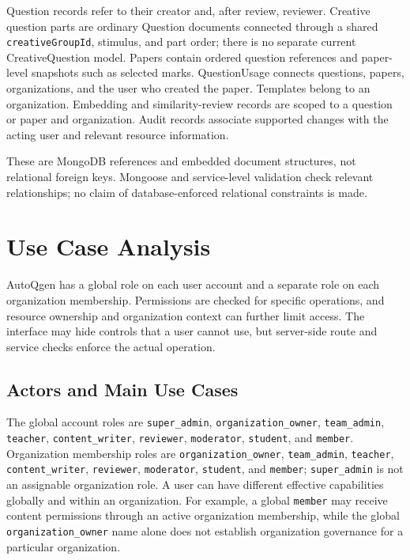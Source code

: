 Question records refer to their creator and, after review, reviewer. Creative question parts are ordinary Question documents connected through a shared \texttt{creativeGroupId}, stimulus, and part order; there is no separate current CreativeQuestion model. Papers contain ordered question references and paper-level snapshots such as selected marks. QuestionUsage connects questions, papers, organizations, and the user who created the paper. Templates belong to an organization. Embedding and similarity-review records are scoped to a question or paper and organization. Audit records associate supported changes with the acting user and relevant resource information.

These are MongoDB references and embedded document structures, not relational foreign keys. Mongoose and service-level validation check relevant relationships; no claim of database-enforced relational constraints is made.



\section{Use Case Analysis}

AutoQgen has a global role on each user account and a separate role on each organization membership. Permissions are checked for specific operations, and resource ownership and organization context can further limit access. The interface may hide controls that a user cannot use, but server-side route and service checks enforce the actual operation.

\subsection{Actors and Main Use Cases}

The global account roles are \texttt{super\_admin}, \texttt{organization\_owner}, \texttt{team\_admin}, \texttt{teacher}, \texttt{content\_writer}, \texttt{reviewer}, \texttt{moderator}, \texttt{student}, and \texttt{member}. Organization membership roles are \texttt{organization\_owner}, \texttt{team\_admin}, \texttt{teacher}, \texttt{content\_writer}, \texttt{reviewer}, \texttt{moderator}, \texttt{student}, and \texttt{member}; \texttt{super\_admin} is not an assignable organization role. A user can have different effective capabilities globally and within an organization. For example, a global \texttt{member} may receive content permissions through an active organization membership, while the global \texttt{organization\_owner} name alone does not establish organization governance for a particular organization.

